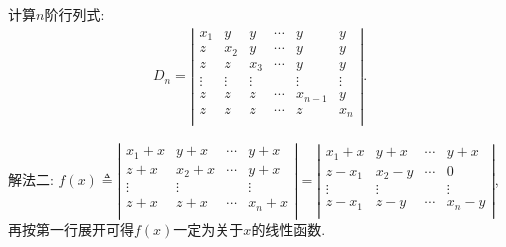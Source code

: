 \documentclass[../../main.tex]{subfiles}
\begin{document}
\begin{proposition}\label{proposition:小拆分法经典例题}
计算$n$阶行列式:
\begin{align*}
D_n=\left| \begin{matrix}
x_1&		y&		y&		\cdots&		y&		y\\
z&		x_2&		y&		\cdots&		y&		y\\
z&		z&		x_3&		\cdots&		y&		y\\
\vdots&		\vdots&		\vdots&		&		\vdots&		\vdots\\
z&		z&		z&		\cdots&		x_{n-1}&		y\\
z&		z&		z&		\cdots&		z&		x_n\\
\end{matrix} \right|.
\end{align*}
\end{proposition}
\begin{note}
{\color{blue}解法二:}
$f(x) \triangleq \left| \begin{matrix}
x_1+x & y+x & \cdots & y+x \\
z+x & x_2+x & \cdots & y+x \\ 
\vdots & \vdots & & \vdots \\
z+x & z+x & \cdots & x_n+x \\
\end{matrix} \right|=\left| \begin{matrix}
x_1+x & y+x & \cdots & y+x \\
z-x_1 & x_2-y & \cdots & 0 \\
\vdots & \vdots & & \vdots \\
z-x_1 & z-y & \cdots & x_n-y \\
\end{matrix} \right|$,再按第一行展开可得$f(x)$一定为关于$x$的线性函数.
\end{note}
\end{document}
